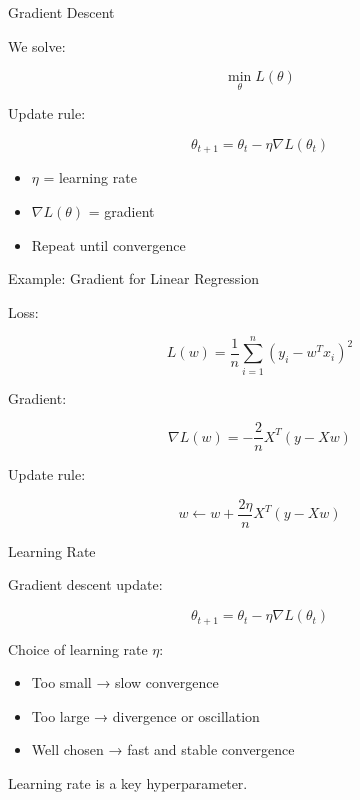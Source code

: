 \documentclass{beamer}
\begin{document}
\begin{frame}{Gradient Descent}

We solve:

\[
\min_{\theta} L(\theta)
\]

\vspace{0.3cm}

Update rule:

\[
\theta_{t+1}
=
\theta_t
-
\eta \nabla L(\theta_t)
\]

\vspace{0.5cm}

\begin{itemize}
    \item $\eta$ = learning rate
    \item $\nabla L(\theta)$ = gradient
    \item Repeat until convergence
\end{itemize}

\end{frame}

\begin{frame}{Example: Gradient for Linear Regression}

Loss:

\[
L(w) = \frac{1}{n} \sum_{i=1}^n (y_i - w^T x_i)^2
\]

\vspace{0.5cm}

Gradient:

\[
\nabla L(w)
=
-\frac{2}{n} X^T (y - Xw)
\]

\vspace{0.5cm}

Update rule:

\[
w \leftarrow w + \frac{2\eta}{n} X^T (y - Xw)
\]

\end{frame}

\begin{frame}{Learning Rate}

Gradient descent update:

\[
\theta_{t+1} = \theta_t - \eta \nabla L(\theta_t)
\]

\vspace{0.5cm}

Choice of learning rate $\eta$:

\begin{itemize}
    \item Too small → slow convergence
    \item Too large → divergence or oscillation
    \item Well chosen → fast and stable convergence
\end{itemize}

\vspace{0.5cm}

Learning rate is a key hyperparameter.

\end{frame}
\end{document}
